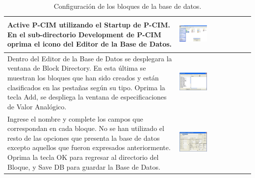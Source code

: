 \begin{table}[ht!]
\centering
\renewcommand*{\arraystretch}{0.01}
\begin{tabular}{*{2}{m{}}}
\hline
  Active P-CIM utilizando el Startup de P-CIM. En el sub-directorio Development 
  de P-CIM oprima el icono del Editor de la Base de Datos.
  &\begin{center}
    \includegraphics[width=0.4\textwidth]
      {Cap5-SCADA/images/startUp.jpeg}
  \end{center}\\
\hline
    Dentro del Editor de la Base de Datos se desplegara la ventana de Block 
    Directory. En esta última se muestran los bloques que han sido creados y
    están clasificados en las pestañas según su tipo.  Oprima la tecla Add, se 
    despliega la ventana de especificaciones de Valor Analógico.
    &\begin{center}
      \includegraphics[width=0.4\textwidth]
	{Cap5-SCADA/images/database.jpeg}
    \end{center}\\
\hline
    Ingrese el nombre y complete los campos que correspondan en cada bloque. 
    No se han utilizado el resto de las opciones que presenta la base de datos 
    excepto aquellos que fueron expresados anteriormente.
    Oprima la tecla OK para regresar al directorio del Bloque,
    y Save DB para guardar la Base de Datos.
    &\begin{center}
      \includegraphics[width=0.4\textwidth]
	{Cap5-SCADA/images/database1.jpeg}
    \end{center}\\
\hline
\end{tabular}
\caption{Configuración de los bloques de la base de datos.}
\label{tab:confBlockDB}
\end{table}



